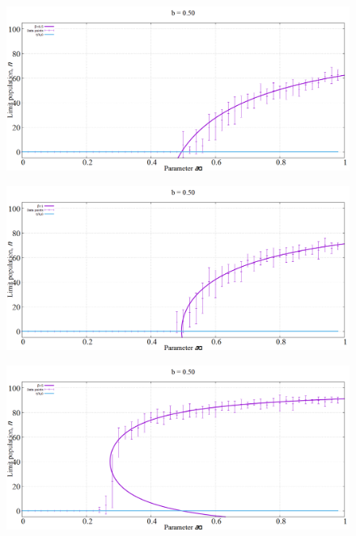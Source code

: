 \begin{figure}[h!]
 \centering
  \includegraphics[width=\linewidth]{images/appendix/simexpt/7.png}
\end{figure}

\begin{figure}[h!]
 \centering
  \includegraphics[width=\linewidth]{images/appendix/simexpt/8.png}
\end{figure}

\begin{figure}[h!]
 \centering
  \includegraphics[width=\linewidth]{images/appendix/simexpt/9.png}
\end{figure}

